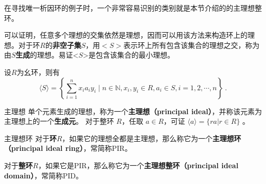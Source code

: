 

在寻找唯一析因环的例子时，一个非常容易识别的类别就是本节介绍的的主理想整环。

可以证明，任意多个理想的交集依然是理想，因而可以用该方法来构造环上的理想。对于环$R$的\textbf{非空子集}$S$，用$<S>$表示环上所有包含该集合的理想之交，称为由$S$\textbf{生成}的理想。易证<$S$>是包含该集合的最小理想。
\begin{example}{}
设$R$为幺环，则有
\begin{equation}
\langle S\rangle=\left\{\sum_{i=1}^n x_i a_iy_i \mid n \in \mathbb{N}, x_i,y_i \in R, a_i \in S, i=1,2, \cdots, n\right\}~.
\end{equation}
\end{example}
\begin{definition}{主理想}
单个元素生成的理想，称为一个\textbf{主理想（principal ideal）}，并称该元素为主理想上的一个\textbf{生成元}。
对于整环 $R$，任取 $a\in R$，可证 $\langle a \rangle=\{ra|r\in R\}$ 。
\end{definition}

\begin{definition}{主理想环}
对于\textbf{环}$R$，如果它的理想全都是主理想，那么称它为一个\textbf{主理想环（principal ideal ring）}，常简称PIR。

对于\textbf{整环}$R$，如果它是PIR，那么称它为一个\textbf{主理想整环（principal ideal domain）}，常简称PID。
\end{definition}







